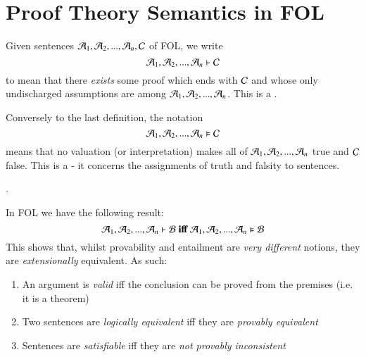 \section{ Proof Theory Semantics in FOL}

\begin{definition}
    Given sentences $\mathcal{A}_1,\mathcal{A}_2,...,\mathcal{A}_n,\mathcal{C}$ of FOL, we write \begin{equation*}
        \mathcal{A}_1,\mathcal{A}_2,...,\mathcal{A}_n\vdash\mathcal{C}
    \end{equation*}
    to mean that there \emph{exists} some proof which ends with $\mathcal{C}$ and whose only undischarged assumptions are among $\mathcal{A}_1,\mathcal{A}_2,...,\mathcal{A}_n$. This is a .
\end{definition}

\begin{definition}
    Conversely to the last definition, the notation \begin{equation*}
        \mathcal{A}_1,\mathcal{A}_2,...,\mathcal{A}_n\vDash \mathcal{C}
    \end{equation*}
    means that no valuation (or interpretation) makes all of $\mathcal{A}_1,\mathcal{A}_2,...,\mathcal{A}_n$ true and $\mathcal{C}$ false. This is a  - it concerns the assignments of truth and falsity to sentences.
\end{definition}

.

\begin{theorem}
    In FOL we have the following result: \begin{equation*}
        \mathcal{A}_1,\mathcal{A}_2,...,\mathcal{A}_n\vdash\mathcal{B}\;\textbf{iff}\;\mathcal{A}_1,\mathcal{A}_2,...,\mathcal{A}_n\vDash\mathcal{B}
    \end{equation*}
    This shows that, whilst provability and entailment are \emph{very different} notions, they are \emph{extensionally} equivalent. As such: \begin{enumerate}
        \item An argument is \emph{valid} iff the conclusion can be proved from the premises (i.e. it is a theorem)
        \item Two sentences are \emph{logically equivalent} iff they are \emph{provably equivalent}
        \item Sentences are \emph{satisfiable} iff they are \emph{not provably inconsistent}
    \end{enumerate}
\end{theorem}


